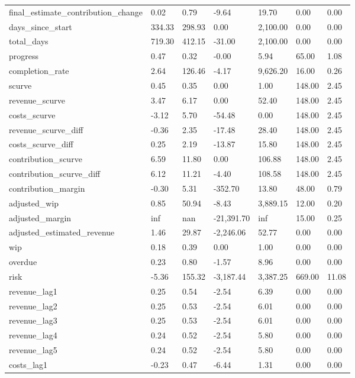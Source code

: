 \begin{landscape}
\begin{longtable}[h!]{lllllll}
final_estimate_contribution_change & 0.02 & 0.79 & -9.64 & 19.70 & 0.00 & 0.00 \\
days_since_start & 334.33 & 298.93 & 0.00 & 2,100.00 & 0.00 & 0.00 \\
total_days & 719.30 & 412.15 & -31.00 & 2,100.00 & 0.00 & 0.00 \\
progress & 0.47 & 0.32 & -0.00 & 5.94 & 65.00 & 1.08 \\
completion_rate & 2.64 & 126.46 & -4.17 & 9,626.20 & 16.00 & 0.26 \\
scurve & 0.45 & 0.35 & 0.00 & 1.00 & 148.00 & 2.45 \\
revenue_scurve & 3.47 & 6.17 & 0.00 & 52.40 & 148.00 & 2.45 \\
costs_scurve & -3.12 & 5.70 & -54.48 & 0.00 & 148.00 & 2.45 \\
revenue_scurve_diff & -0.36 & 2.35 & -17.48 & 28.40 & 148.00 & 2.45 \\
costs_scurve_diff & 0.25 & 2.19 & -13.87 & 15.80 & 148.00 & 2.45 \\
contribution_scurve & 6.59 & 11.80 & 0.00 & 106.88 & 148.00 & 2.45 \\
contribution_scurve_diff & 6.12 & 11.21 & -4.40 & 108.58 & 148.00 & 2.45 \\
contribution_margin & -0.30 & 5.31 & -352.70 & 13.80 & 48.00 & 0.79 \\
adjusted_wip & 0.85 & 50.94 & -8.43 & 3,889.15 & 12.00 & 0.20 \\
adjusted_margin & inf & nan & -21,391.70 & inf & 15.00 & 0.25 \\
adjusted_estimated_revenue & 1.46 & 29.87 & -2,246.06 & 52.77 & 0.00 & 0.00 \\
wip & 0.18 & 0.39 & 0.00 & 1.00 & 0.00 & 0.00 \\
overdue & 0.23 & 0.80 & -1.57 & 8.96 & 0.00 & 0.00 \\
risk & -5.36 & 155.32 & -3,187.44 & 3,387.25 & 669.00 & 11.08 \\
revenue_lag1 & 0.25 & 0.54 & -2.54 & 6.39 & 0.00 & 0.00 \\
revenue_lag2 & 0.25 & 0.53 & -2.54 & 6.01 & 0.00 & 0.00 \\
revenue_lag3 & 0.25 & 0.53 & -2.54 & 6.01 & 0.00 & 0.00 \\
revenue_lag4 & 0.24 & 0.52 & -2.54 & 5.80 & 0.00 & 0.00 \\
revenue_lag5 & 0.24 & 0.52 & -2.54 & 5.80 & 0.00 & 0.00 \\
costs_lag1 & -0.23 & 0.47 & -6.44 & 1.31 & 0.00 & 0.00 \\

\end{longtable}
\end{landscape}
